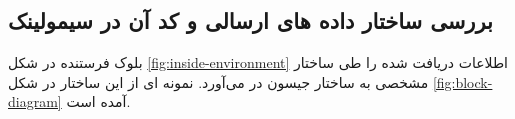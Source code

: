 \subsection{بررسی ساختار داده های ارسالی  و کد آن در سیمولینک}\label{ch:fani|sec:simulink|sub:json}

بلوک فرستنده در شکل
\ref{fig:inside-environment}
اطلاعات دریافت شده را طی ساختار مشخصی به ساختار جیسون در می‌آورد.
نمونه ای از این ساختار در شکل
\ref{fig:block-diagram}
آمده است.









